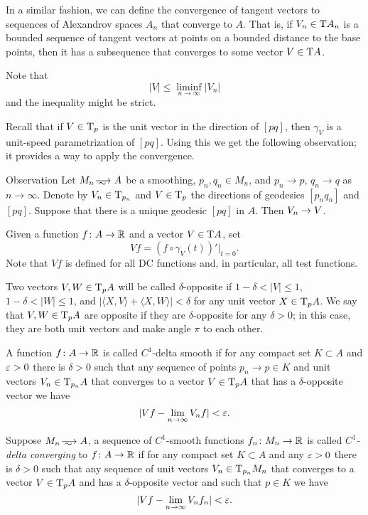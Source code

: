 In a similar fashion, we can define the convergence of tangent vectors to sequences of Alexandrov spaces $A_n$ that converge to $A$.
That is, if $V_n\in \mathrm{T} A_n$ is a bounded sequence of tangent vectors at points on a bounded distance to the base points, then it has a subsequence that converges to some vector $V\in \mathrm{T} A$.

Note that 
\[|V|\le \liminf_{n\to\infty} |V_n|\]
and the inequality might be strict.

Recall that if $V\in \mathrm{T}_p$ is the unit vector in the direction of $[pq]$, then $\gamma_V$ is a unit-speed parametrization of $[pq]$.
Using this we get the following observation;
it provides a way to apply the convergence.

\begin{thm}{Observation}
Let $M_n\smooths{} A$ be a smoothing, $p_n,q_n\in M_n$, and $p_n\to p$, $q_n\to q$ as $n\to \infty$.
Denote by $V_n\in \mathrm{T}_{p_n}$ and $V\in \mathrm{T}_p$ the directions of geodesics $[p_nq_n]$ and $[pq]$.
Suppose that there is a unique geodesic $[pq]$ in $A$.
Then $V_n\zz\to V$.
\end{thm}



Given a function $f\colon A\to \mathbb{R}$ and a vector $V\in \mathrm{T} A$, set
\[Vf=(f\circ\gamma_V(t))'|_{t=0}.\]
Note that $Vf$ is defined for all DC functions and, in particular, all test functions.

Two vectors $V,W\in \mathrm{T}_pA$ will be called $\delta$-opposite if
$1-\delta< |V|\le 1$,
$1-\delta< |W|\le 1$,
and $|\langle X,V\rangle +\langle X,W\rangle|<\delta$ for any unit vector $X\in \mathrm{T}_p A$.
We say that $V,W\in \mathrm{T}_pA$ are opposite if they are $\delta$-opposite for any $\delta>0$;
in this case, they are both unit vectors and make angle $\pi$ to each other.

A function $f\colon A\to\mathbb{R}$ is called $C^1$-delta smooth if for any compact set $K\subset A$ and $\varepsilon>0$ there is $\delta>0$ such that any sequence of points $p_n\to p\in K$ and unit vectors $V_n\in \mathrm{T}_{p_n} A$ that converges to a vector $V\in \mathrm{T}_p A$ that has a $\delta$-opposite vector we have
\[|Vf-\lim_{n\to\infty} V_nf|<\varepsilon.\]

Suppose $M_n\smooths{} A$, a sequence of $C^1$-smooth functions $f_n\:M_n\zz\to\RR$ is called \emph{$C^1$-delta converging} to $f\colon A\to \mathbb{R}$ if for any compact set $K\subset A$ and any $\varepsilon>0$ there is $\delta>0$ such that any sequence of unit vectors $V_n\in \mathrm{T}_{p_n} M_n$ that converges to a vector $V\zz\in \T_p A$ and has a $\delta$-opposite vector and such that $p\in K$ we have
\[|Vf-\lim_{n\to\infty} V_nf_n|<\varepsilon.\]

